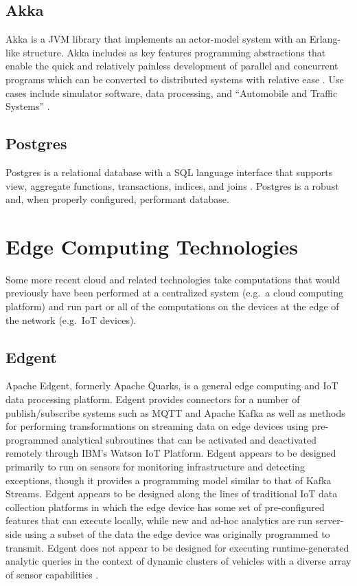\documentclass{thesis}
\begin{document}
    \subsection{Akka}
        Akka is a JVM library that implements an actor-model system with an Erlang-like structure.
        Akka includes as key features programming abstractions that enable the quick and relatively
        painless development of parallel and concurrent programs which can be converted to distributed
        systems with relative ease \cite{akka}. Use cases include simulator software, data processing,
        and ``Automobile and Traffic Systems'' \cite{akka}.
    \subsection{Postgres}
        Postgres is a relational database with a SQL language interface that supports view, aggregate
        functions, transactions, indices, and joins \cite{postgres}. Postgres is a robust and, when
        properly configured, performant database.
    \section{Edge Computing Technologies}
        Some more recent cloud and related technologies take computations that would previously have
        been performed at a centralized system (e.g.\ a cloud computing platform) and run part or all
        of the computations on the devices at the edge of the network (e.g.\ IoT devices).
    \subsection{Edgent}
        Apache Edgent, formerly Apache Quarks, is a general edge computing and IoT data processing
        platform. Edgent provides connectors for a number of publish/subscribe systems such as 
        MQTT and Apache Kafka as well as methods for performing transformations on streaming
        data on edge devices using pre-programmed analytical subroutines that can be activated and
        deactivated remotely through IBM's Watson IoT Platform. Edgent appears to be designed
        primarily to run on sensors for monitoring infrastructure and detecting exceptions, though
        it provides a programming model similar to that of Kafka Streams. Edgent appears to be 
        designed along the lines of traditional IoT data collection platforms in which the edge
        device has some set of pre-configured features that can execute locally, while new and
        ad-hoc analytics are run server-side using a subset of the data the edge device
        was originally programmed to transmit. Edgent does not appear to be designed for executing
        runtime-generated analytic queries in the context of dynamic clusters of vehicles with a diverse
        array of sensor capabilities \cite{edgent}.
\end{document}
